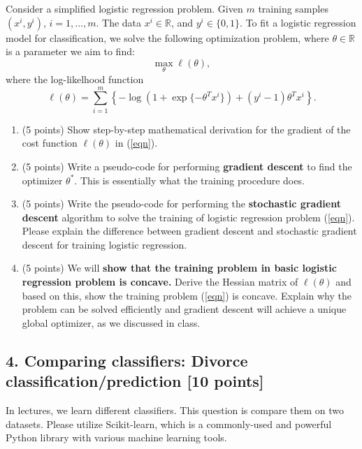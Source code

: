 \documentclass[12pt]{article}
\begin{document}
Consider a simplified logistic regression problem. 
Given $m$ training samples $(x^i, y^i)$, $i = 1, \ldots, m$. The data $x^i \in \mathbb R$, and $y^i \in \{0, 1\}$.  To fit a logistic regression model for classification, we solve the following optimization problem, where $\theta \in \mathbb R$ is a parameter we aim to find:
\begin{equation}
\max_\theta \ell (\theta), \label{eqn}
\end{equation}
where the log-likelhood function \[\ell(\theta) = \sum_{i=1}^m \left\{-\log (1+\exp\{-\theta^T x^i\}) + (y^i-1) \theta^T x^i\right\}.\]

\begin{enumerate}
\item (5 points) Show step-by-step mathematical derivation for the gradient of the cost function $\ell(\theta)$ in (\ref{eqn}).
\item (5 points) Write a pseudo-code  for performing {\bf gradient descent} to find the optimizer $\theta^*$. This is essentially what the training procedure does. 
\item (5 points) Write the pseudo-code for performing the {\bf stochastic gradient descent} algorithm to solve the training of logistic regression problem (\ref{eqn}). Please explain the difference between gradient descent and stochastic gradient descent for training logistic regression.
\item (5 points) We will {\bf show that the training problem in basic logistic regression problem is concave.} Derive the Hessian matrix of $\ell(\theta)$ and based on this, show the training problem (\ref{eqn}) is concave. Explain why the problem can be solved efficiently and gradient descent will achieve a unique global optimizer, as we discussed in class. 
\end{enumerate}


\subsection*{4. Comparing classifiers: Divorce classification/prediction [10 points]}

In lectures, we learn different classifiers. This question is compare them on two datasets. Please utilize \textsf{Scikit-learn}, which is a commonly-used and powerful \textsf{Python} library with various machine learning tools.
\end{document}
